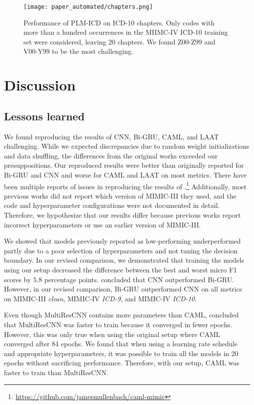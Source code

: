 {\begin{figure}[t]
    \centering
    \texttt{[image: paper\_automated/chapters.png]}
    \caption[Performance of PLM-ICD on ICD-10 chapters]{Performance of PLM-ICD on ICD-10 chapters. Only codes with more than a hundred occurrences in the MIIMC-IV ICD-10 training set were considered, leaving 20 chapters. We found Z00-Z99 and V00-Y99 to be the most challenging.}
    \label{fig:chapter_performance}
\end{figure}




\section{Discussion}
\subsection{Lessons learned}
We found reproducing the results of CNN, Bi-GRU, CAML, and LAAT challenging. While we expected discrepancies due to random weight initializations and data shuffling, the differences from the original works exceeded our presuppositions. Our reproduced results were better than originally reported for Bi-GRU and CNN and worse for CAML and LAAT on most metrics. There have been multiple reports of issues in reproducing the results of \citet{mullenbachExplainablePredictionMedical2018}.\footnote{\url{https://github.com/jamesmullenbach/caml-mimic}} Additionally, most previous works did not report which version of MIMIC-III they used, and the code and hyperparameter configurations were not documented in detail. Therefore, we hypothesize that our results differ because previous works report incorrect hyperparameters or use an earlier version of MIMIC-III.

We showed that models previously reported as low-performing underperformed partly due to a poor selection of hyperparameters and not tuning the decision boundary. In our revised comparison, we demonstrated that training the models using our setup decreased the difference between the best and worst micro F1 scores by $5.8$ percentage points. \citet{mullenbachExplainablePredictionMedical2018} concluded that CNN outperformed Bi-GRU. However, in our revised comparison, Bi-GRU outperformed CNN on all metrics on MIMIC-III \textit{clean}, MIMIC-IV \textit{ICD-9}, and MIMIC-IV \textit{ICD-10}.

Even though MultiResCNN contains more parameters than CAML, \citet{liICDCodingClinical2020} concluded that MultiResCNN was faster to train because it converged in fewer epochs. However, this was only true when using the original setup where CAML converged after 84 epochs. We found that when using a learning rate schedule and appropriate hyperparameters, it was possible to train all the models in 20 epochs without sacrificing performance. Therefore, with our setup, CAML was faster to train than MultiResCNN.

}
